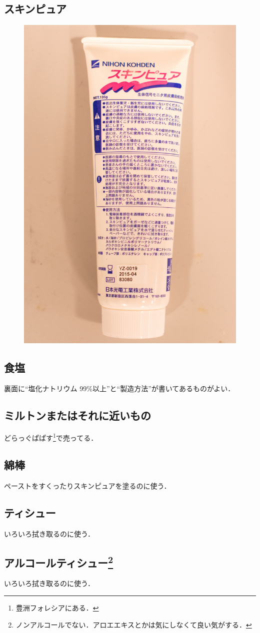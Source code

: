 \documentclass[a4j, twocolumn, openleft, uplatex, dvipdfmx]{jsbook}
\begin{document}
        \subsection*{スキンピュア}
            \begin{figure}[H]
                \centering
                \includegraphics[width=0.5\linewidth]{./figure/skinpure.jpg}
            \end{figure}
        \subsection*{食塩}
            裏面に``塩化ナトリウム 99\%以上''と``製造方法''が書いてあるものがよい．
        \subsection*{ミルトンまたはそれに近いもの}
            どらっぐぱぱす\footnote{豊洲フォレシアにある．}で売ってる．
        \subsection*{綿棒}
            ペーストをすくったりスキンピュアを塗るのに使う．
        \subsection*{ティシュー}
            いろいろ拭き取るのに使う．
        \subsection*{アルコールティシュー\footnote{ノンアルコールでない．アロエエキスとかは気にしなくて良い気がする．}}
            いろいろ拭き取るのに使う．
\end{document}
